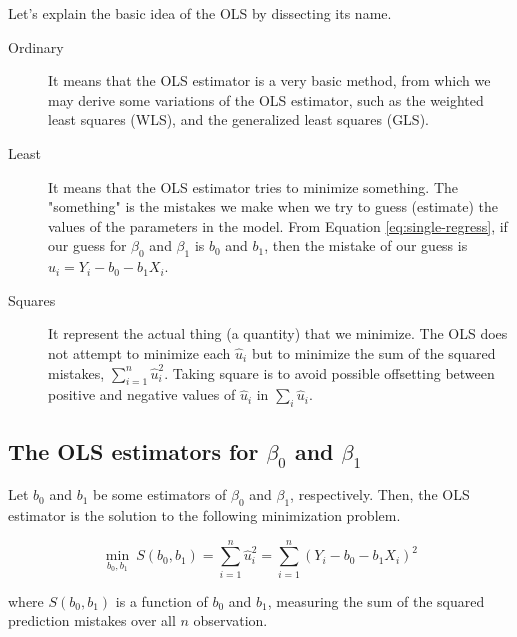 \documentclass[a4paper,11pt]{article}
\begin{document}
Let's explain the basic idea of the OLS by dissecting its name.
\begin{description}
\item[{Ordinary}] It means that the OLS estimator is a very basic method,
from which we may derive some variations of the OLS
estimator, such as the weighted least squares (WLS), and the
generalized least squares (GLS).
\item[{Least}] It means that the OLS estimator tries to minimize
something. The "something" is the mistakes we
make when we try to guess (estimate) the values of the
parameters in the model. From Equation
\ref{eq:single-regress}, if our guess for \(\beta_0\) and
\(\beta_1\) is \(b_0\) and \(b_1\), then the mistake of our guess
is \(\hat{u}_{i} = Y_{i} - b_0 - b_1 X_i\).
\item[{Squares}] It represent the actual thing (a quantity) that we
minimize. The OLS does not attempt to minimize each
\(\hat{u}_{i}\) but to minimize the sum of the squared
mistakes, \(\sum_{i=1}^n \hat{u}_i^2\). Taking square is to
avoid possible offsetting between positive and negative values of
\(\hat{u}_i\) in \(\sum_i \hat{u}_i\).
\end{description}

\subsection{The OLS estimators for \(\beta_0\) and \(\beta_1\)}
\label{sec:org35380d5}

Let \(b_0\) and \(b_1\) be some estimators of \(\beta_0\) and \(\beta_1\),
respectively. Then, the OLS estimator is the
solution to the following minimization problem.

\begin{equation}
\operatorname*{min}_{b_0, b_1}\: S(b_0, b_1) = \sum_{i=1}^n \hat{u}_i^2 = \sum_{i=1}^n (Y_i - b_0 - b_1 X_i)^2 \label{eq:min-ols}
\end{equation}

where \(S(b_0, b_1)\) is a function of \(b_0\) and \(b_1\), measuring the
sum of the squared prediction mistakes over all \(n\) observation.
\end{document}

